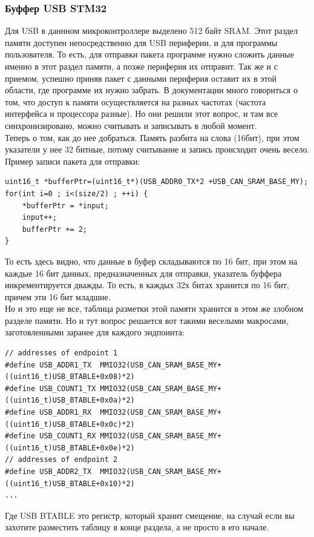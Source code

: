 \documentclass[12pt,a4paper]{article}
\begin{document}
\subsubsection{Буффер USB STM32}
    Для USB в даннном микроконтроллере выделено 512 байт SRAM. Этот раздел памяти
    доступен непосредственно для USB периферии, и для программы пользователя.
    То есть, для отправки пакета программе нужно сложить данные именно в этот
    раздел памяти, а позже периферия их отправит. Так же и с приемом, успешно
    приняв пакет с данными периферия оставит их в этой области, где программе
    их нужно забрать. В документации много говориться о том, что доступ к
    памяти осуществляется на разных частотах (частота интерфейса и процессора
    разные). Но они решили этот вопрос, и там все синхронизировано, можно
    считывать и записывать в любой момент.\\
    Теперь о том, как до нее добраться. Память разбита на слова (16бит), при
    этом указатели у нее 32 битные, потому считывание и запись происходит
    очень весело. Пример записи пакета для отправки:
\lstset{language=c}
\begin{lstlisting}
uint16_t *bufferPtr=(uint16_t*)(USB_ADDR0_TX*2 +USB_CAN_SRAM_BASE_MY);
for(int i=0 ; i<(size/2) ; ++i) {
    *bufferPtr = *input;
    input++;
    bufferPtr += 2;
}
\end{lstlisting}
    То есть здесь видно, что данные в буфер складываются по 16 бит, при этом на
    каждые 16 бит данных, предназначенных для отправки, указатель буффера
    инкрементируется дважды. То есть, в каждых 32х битах хранится по 16 бит,
    причем эти 16 бит младшие.\\
    Но и это еще не все, таблица разметки этой памяти хранится в этом
    же злобном разделе памяти. Но и тут вопрос решается вот такими веселыми макросами,
    заготовленными заранее для каждого эндпоинта:
\begin{lstlisting}
// addresses of endpoint 1
#define USB_ADDR1_TX  MMIO32(USB_CAN_SRAM_BASE_MY+((uint16_t)USB_BTABLE+0x08)*2)
#define USB_COUNT1_TX MMIO32(USB_CAN_SRAM_BASE_MY+((uint16_t)USB_BTABLE+0x0a)*2)
#define USB_ADDR1_RX  MMIO32(USB_CAN_SRAM_BASE_MY+((uint16_t)USB_BTABLE+0x0c)*2)
#define USB_COUNT1_RX MMIO32(USB_CAN_SRAM_BASE_MY+((uint16_t)USB_BTABLE+0x0e)*2)
// addresses of endpoint 2
#define USB_ADDR2_TX  MMIO32(USB_CAN_SRAM_BASE_MY+((uint16_t)USB_BTABLE+0x10)*2)
...
\end{lstlisting}
    Где USB BTABLE это регистр, который хранит смещение, на случай если вы
    захотите разместить таблицу в конце раздела, а не просто в его начале.
\end{document}
